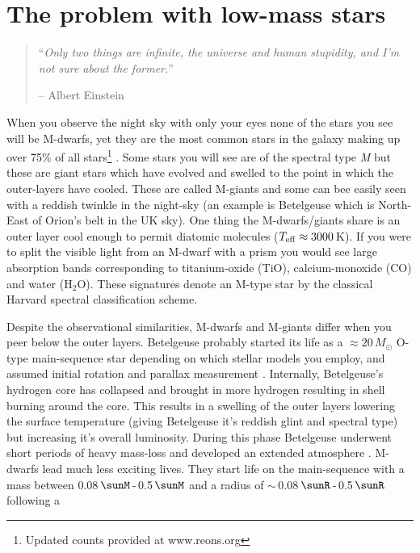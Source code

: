 \iffalse
\chapter{The problem with low-mass stars}

\begin{quote}
``{\it Only two things are infinite, the universe and human stupidity, and I'm not sure about the former.}''

-- Albert Einstein
\end{quote}

When you observe the night sky with only your eyes none of the stars you see will be M-dwarfs, yet they are the most common stars in the galaxy making up over 75\% of all stars\footnote{Updated counts provided at www.reons.org} \cite{2006AJ....132.2360H}. Some stars you will see are of the spectral type \textit{M} but these are giant stars which have evolved and swelled to the point in which the outer-layers have cooled. These are called M-giants and some can bee easily seen with a reddish twinkle in the night-sky (an example is Betelgeuse which is North-East of Orion's belt in the UK sky). One thing the M-dwarfs/giants share is an outer layer cool enough to permit diatomic molecules ($T_{\rm eff} \approx 3000$\,K). If you were to split the visible light from an M-dwarf with a prism you would see large absorption bands corresponding to titanium-oxide (TiO), calcium-monoxide (CO) and water (H$_2$O). These signatures denote an M-type star by the classical Harvard spectral classification scheme. 

Despite the observational similarities, M-dwarfs and M-giants differ when you peer below the outer layers. Betelgeuse probably started its life as a $\approx 20\,M_{\odot}$ O-type main-sequence star depending on which stellar models you employ, and assumed initial rotation and parallax measurement \cite{2013EAS....60..307V}. Internally, Betelgeuse's hydrogen core has collapsed and brought in more hydrogen resulting in shell burning around the core. This results in a swelling of the outer layers lowering the surface temperature (giving Betelgeuse it's reddish glint and spectral type) but increasing it's overall luminosity.   During this phase Betelgeuse underwent short periods of heavy mass-loss and developed an extended atmosphere \cite{2014Natur.512..282M}. M-dwarfs lead much less exciting lives. They start life on the main-sequence with a mass between  0.08\,$\sunM$\,-\,0.5\,$\sunM$ and a radius of $\sim$\,0.08\,$\sunR$\,-\,0.5\,$\sunR$ \cite{1946Natur.157..481E} following a  




